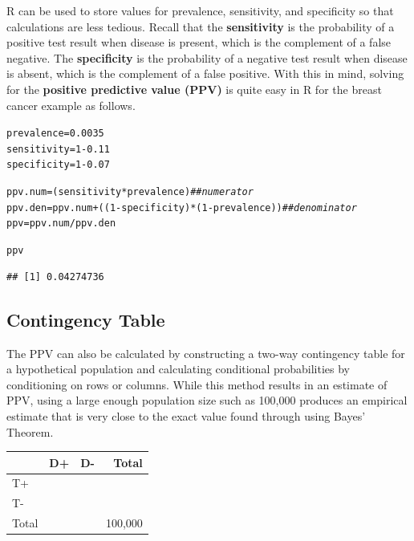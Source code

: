 \documentclass{report}\usepackage[]{graphicx}\usepackage[]{color}
\makeatletter
\newcommand{\hlnum}[1]{\textcolor[rgb]{0.686,0.059,0.569}{#1}}%
\newcommand{\hlcom}[1]{\textcolor[rgb]{0.678,0.584,0.686}{\textit{#1}}}%
\newcommand{\hlopt}[1]{\textcolor[rgb]{0,0,0}{#1}}%
\newcommand{\hlstd}[1]{\textcolor[rgb]{0.345,0.345,0.345}{#1}}%
\newcommand{\hlkwb}[1]{\textcolor[rgb]{0.69,0.353,0.396}{#1}}%
\newenvironment{kframe}{%
 \def\at@end@of@kframe{}%
 \ifinner\ifhmode%
  \def\at@end@of@kframe{\end{minipage}}%
  \begin{minipage}{\columnwidth}%
 \fi\fi%
 \def\FrameCommand##1{\hskip\@totalleftmargin \hskip-\fboxsep
 \colorbox{shadecolor}{##1}\hskip-\fboxsep
     \hskip-\linewidth \hskip-\@totalleftmargin \hskip\columnwidth}%
 \MakeFramed {\advance\hsize-\width
   \@totalleftmargin\z@ \linewidth\hsize
   \@setminipage}}%
 {\par\unskip\endMakeFramed%
 \at@end@of@kframe}
\newenvironment{knitrout}{}{} %
\makeatother
\begin{document}
\textsf{R} can be used to store values for prevalence, sensitivity, and specificity so that calculations are less tedious. Recall that the \textbf{sensitivity} is the probability of a positive test result when disease is present, which is the complement of a false negative. The \textbf{specificity} is the probability of a negative test result when disease is absent, which is the complement of a false positive.  With this in mind, solving for the \textbf{positive predictive value (PPV)} is quite easy in \textsf{R} for the breast cancer example as follows.  

\begin{knitrout}
\color{fgcolor}\begin{kframe}
\begin{alltt}
\hlstd{prevalence} \hlkwb{=} \hlnum{0.0035}
\hlstd{sensitivity} \hlkwb{=} \hlnum{1} \hlopt{-} \hlnum{0.11}
\hlstd{specificity} \hlkwb{=} \hlnum{1} \hlopt{-} \hlnum{0.07}

\hlstd{ppv.num} \hlkwb{=} \hlstd{(sensitivity}\hlopt{*}\hlstd{prevalence)}  \hlcom{## numerator}
\hlstd{ppv.den} \hlkwb{=} \hlstd{ppv.num} \hlopt{+} \hlstd{((}\hlnum{1}\hlopt{-}\hlstd{specificity)}\hlopt{*}\hlstd{(}\hlnum{1}\hlopt{-}\hlstd{prevalence))}  \hlcom{## denominator}
\hlstd{ppv} \hlkwb{=} \hlstd{ppv.num} \hlopt{/} \hlstd{ppv.den}

\hlstd{ppv}
\end{alltt}
\begin{verbatim}
## [1] 0.04274736
\end{verbatim}
\end{kframe}
\end{knitrout}


\subsection{Contingency Table}

The PPV can also be calculated by constructing a two-way contingency table for a hypothetical population and calculating conditional probabilities by conditioning on rows or columns. While this method results in an estimate of PPV, using a large enough population size such as 100,000 produces an empirical estimate that is very close to the exact value found through using Bayes' Theorem. 

\begin{center}
\begin{tabular}{|l|c|c|r|}
\hline 
& D+ & D- & Total\\ 
\hline
T+ & & & \\ 
\hline
T- & & & \\ 
\hline 
Total & & & 100,000 \\ 
\hline 
\end{tabular} 
\end{center} 
\end{document}
